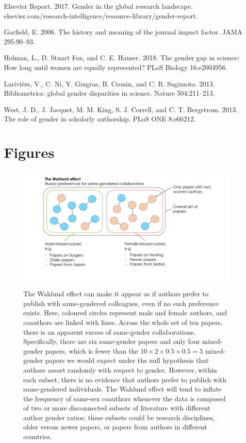 \documentclass[12pt,]{article}
\begin{document}
\hypertarget{ref-Elsevier_report}{}
Elsevier Report. 2017. Gender in the global research landscape.
elsevier.com/research-intelligence/resource-library/gender-report.

\hypertarget{ref-Garfield_2006}{}
Garfield, E. 2006. The history and meaning of the journal impact factor.
JAMA 295:90--93.

\hypertarget{ref-Holman_2018}{}
Holman, L., D. Stuart Fox, and C. E. Hauser. 2018. The gender gap in
science: How long until women are equally represented? PLoS Biology
16:e2004956.

\hypertarget{ref-Lariviere_2013}{}
Larivière, V., C. Ni, Y. Gingras, B. Cronin, and C. R. Sugimoto. 2013.
Bibliometrics: global gender disparities in science. Nature
504:211--213.

\hypertarget{ref-West_2013}{}
West, J. D., J. Jacquet, M. M. King, S. J. Correll, and C. T. Bergstrom.
2013. The role of gender in scholarly authorship. PLoS ONE 8:e66212.

\newpage

\section{Figures}\label{figures}

\begin{figure}
\centering
\includegraphics{../figures/Figure 1 - Wahlund figure.pdf}
\caption{The Wahlund effect can make it appear as if authors prefer to
publish with same-gendered colleagues, even if no such preference
exists. Here, coloured circles represent male and female authors, and
coauthors are linked with lines. Across the whole set of ten papers,
there is an apparent excess of same-gender collaborations. Specifically,
there are six same-gender papers and only four mixed-gender papers,
which is fewer than the \(10\times2\times0.5\times0.5 = 5\) mixed-gender
papers we would expect under the null hypothesis that authors assort
randomly with respect to gender. However, within each subset, there is
no evidence that authors prefer to publish with same-gendered
individuals. The Wahlund effect will tend to inflate the frequency of
same-sex coauthors whenever the data is composed of two or more
disconnected subsets of literature with different author gender ratios;
these subsets could be research disciplines, older versus newer papers,
or papers from authors in different countries. \label{wahlund_plot}}
\end{figure}
\end{document}

